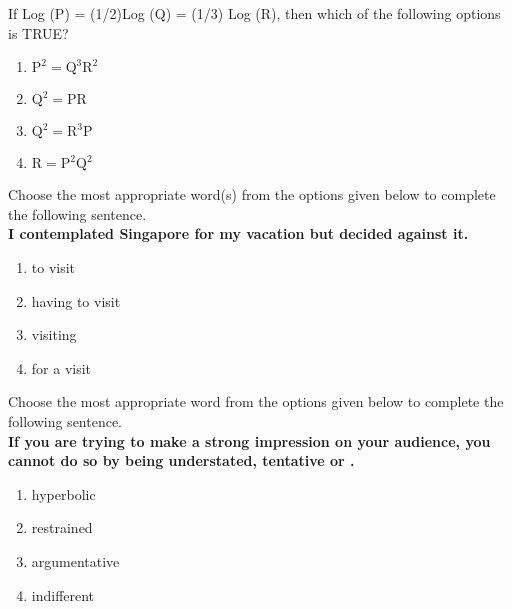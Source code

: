 \item If Log (P) = (1/2)Log (Q) = (1/3) Log (R), then which of the following options is TRUE?
\begin{enumerate}
    \item $\text{P}^2=\text{Q}^3\text{R}^2$
    \item $\text{Q}^2=\text{PR}$
    \item $\text{Q}^2=\text{R}^3\text{P}$
    \item $\text{R}=\text{P}^2\text{Q}^2$
\end{enumerate}
\item Choose the most appropriate word(s) from the options given below to complete the following sentence.\\
\textbf{I contemplated \underline{\hspace{3cm}} Singapore for my vacation but decided against it.}
\begin{enumerate}
    \item to visit
    \item having to visit
    \item visiting
    \item for a visit
\end{enumerate}
\item Choose the most appropriate word from the options given below to complete the following sentence. \\
\textbf{If you are trying to make a strong impression on your audience, you cannot do so by being understated, tentative or \underline{\hspace{3cm}}.}
\begin{enumerate}
    \item hyperbolic
    \item restrained
    \item argumentative
    \item indifferent
\end{enumerate}
